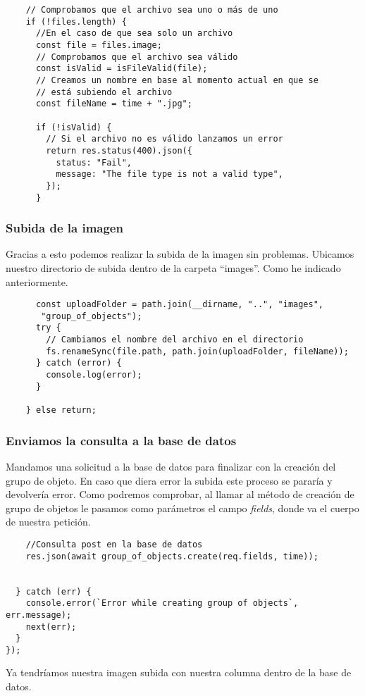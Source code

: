 \begin{verbatim}
    // Comprobamos que el archivo sea uno o más de uno
    if (!files.length) {
      //En el caso de que sea solo un archivo
      const file = files.image;
      // Comprobamos que el archivo sea válido
      const isValid = isFileValid(file);
      // Creamos un nombre en base al momento actual en que se
      // está subiendo el archivo
      const fileName = time + ".jpg";

      if (!isValid) {
        // Si el archivo no es válido lanzamos un error
        return res.status(400).json({
          status: "Fail",
          message: "The file type is not a valid type",
        });
      }
\end{verbatim}

\subsubsection{Subida de la imagen}
Gracias a esto podemos realizar la subida de la imagen sin problemas. Ubicamos nuestro directorio de subida dentro de la carpeta ``images''. Como he indicado anteriormente.

\begin{verbatim}
      const uploadFolder = path.join(__dirname, "..", "images",
       "group_of_objects");
      try {
        // Cambiamos el nombre del archivo en el directorio
        fs.renameSync(file.path, path.join(uploadFolder, fileName));
      } catch (error) {
        console.log(error);
      }

    } else return;
\end{verbatim}

\subsubsection{Enviamos la consulta a la base de datos}
Mandamos una solicitud a la base de datos para finalizar con la creación del grupo de objeto. En caso que diera error la subida este proceso se pararía y devolvería error. Como podremos comprobar, al llamar al método de creación de grupo de objetos le pasamos como parámetros el campo \textit{fields}, donde va el cuerpo de nuestra petición.

\begin{verbatim}
    //Consulta post en la base de datos
    res.json(await group_of_objects.create(req.fields, time));


  } catch (err) {
    console.error(`Error while creating group of objects`, err.message);
    next(err);
  }
});
\end{verbatim}

Ya tendríamos nuestra imagen subida con nuestra columna dentro de la base de datos.

